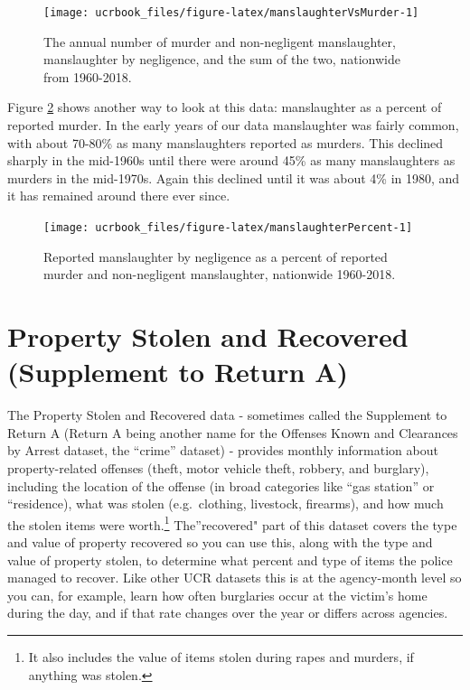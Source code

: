 \documentclass[
  12pt,
  openany]{book}
\begin{document}
\begin{figure}

{\centering \texttt{[image: ucrbook\_files/figure-latex/manslaughterVsMurder-1]} 

}

\caption{The annual number of murder and non-negligent manslaughter, manslaughter by negligence, and the sum of the two, nationwide from 1960-2018.}\label{fig:manslaughterVsMurder}
\end{figure}

Figure \ref{fig:manslaughterPercent} shows another way to look at this data: manslaughter as a percent of reported murder. In the early years of our data manslaughter was fairly common, with about 70-80\% as many manslaughters reported as murders. This declined sharply in the mid-1960s until there were around 45\% as many manslaughters as murders in the mid-1970s. Again this declined until it was about 4\% in 1980, and it has remained around there ever since.

\begin{figure}

{\centering \texttt{[image: ucrbook\_files/figure-latex/manslaughterPercent-1]} 

}

\caption{Reported manslaughter by negligence as a percent of reported murder and non-negligent manslaughter, nationwide 1960-2018.}\label{fig:manslaughterPercent}
\end{figure}

\hypertarget{stolen_property}{%
\chapter{Property Stolen and Recovered (Supplement to Return A)}\label{stolen_property}}

The Property Stolen and Recovered data - sometimes called the Supplement to Return A (Return A being another name for the Offenses Known and Clearances by Arrest dataset, the ``crime'' dataset) - provides monthly information about property-related offenses (theft, motor vehicle theft, robbery, and burglary), including the location of the offense (in broad categories like ``gas station'' or ``residence), what was stolen (e.g.~clothing, livestock, firearms), and how much the stolen items were worth.\footnote{It also includes the value of items stolen during rapes and murders, if anything was stolen.} The''recovered" part of this dataset covers the type and value of property recovered so you can use this, along with the type and value of property stolen, to determine what percent and type of items the police managed to recover. Like other UCR datasets this is at the agency-month level so you can, for example, learn how often burglaries occur at the victim's home during the day, and if that rate changes over the year or differs across agencies.
\end{document}
